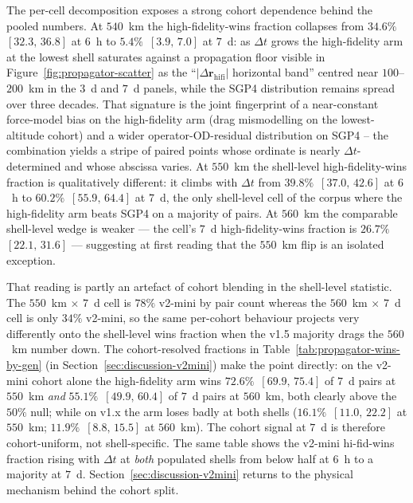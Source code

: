 \documentclass[10pt, letterpaper]{article}
\begin{document}
The per-cell decomposition exposes a strong cohort dependence behind
the pooled numbers. At $540$~km the high-fidelity-wins fraction
collapses from $34.6\%$~$[32.3,\,36.8]$ at $6$~h to
$5.4\%$~$[3.9,\,7.0]$ at $7$~d: as $\Delta t$ grows the high-fidelity
arm at the lowest shell saturates against a propagation floor
visible in Figure~\ref{fig:propagator-scatter} as the
``$|\Delta\mathbf{r}_{\mathrm{hifi}}|$ horizontal band'' centred near
$100$--$200$~km in the $3$~d and $7$~d panels, while the SGP4
distribution remains spread over three decades. That signature is
the joint fingerprint of a near-constant force-model bias on the
high-fidelity arm (drag mismodelling on the lowest-altitude cohort)
and a wider operator-OD-residual distribution on SGP4 -- the
combination yields a stripe of paired points whose ordinate is
nearly $\Delta t$-determined and whose abscissa varies. At $550$~km
the shell-level high-fidelity-wins fraction is qualitatively different:
it climbs with $\Delta t$ from $39.8\%$~$[37.0,\,42.6]$ at $6$~h to
$60.2\%$~$[55.9,\,64.4]$ at $7$~d, the only shell-level cell of the
corpus where the high-fidelity arm beats SGP4 on a majority of pairs.
At $560$~km the comparable shell-level wedge is weaker --- the cell's
$7$~d high-fidelity-wins fraction is $26.7\%$~$[22.1,\,31.6]$ ---
suggesting at first reading that the $550$~km flip is an isolated
exception.

That reading is partly an artefact of cohort blending in the
shell-level statistic. The $550$~km $\times$ $7$~d cell is
$78\%$ v2-mini by pair count whereas the $560$~km $\times$ $7$~d
cell is only $34\%$ v2-mini, so the same per-cohort behaviour
projects very differently onto the shell-level wins fraction when
the v1.5 majority drags the $560$~km number down. The
cohort-resolved fractions in
Table~\ref{tab:propagator-wins-by-gen} (in
Section~\ref{sec:discussion-v2mini}) make the point directly: on
the v2-mini cohort alone the high-fidelity arm wins
$72.6\%$~$[69.9,\,75.4]$ of $7$~d pairs at $550$~km \emph{and}
$55.1\%$~$[49.9,\,60.4]$ of $7$~d pairs at $560$~km, both clearly
above the $50\%$ null; while on v1.x the arm loses badly at
both shells ($16.1\%$~$[11.0,\,22.2]$ at $550$~km;
$11.9\%$~$[8.8,\,15.5]$ at $560$~km). The cohort signal at
$7$~d is therefore cohort-uniform, not shell-specific. The same
table shows the v2-mini hi-fid-wins fraction rising with
$\Delta t$ at \emph{both} populated shells from below half at
$6$~h to a majority at $7$~d.
Section~\ref{sec:discussion-v2mini} returns to the physical
mechanism behind the cohort split.
\end{document}
